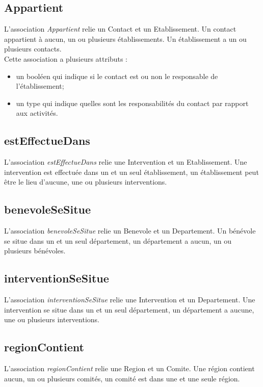 \documentclass[asi, sansVersion]{picInsa}
\begin{document}
\subsection*{Appartient}

L'association \textit{Appartient} relie un Contact et un Etablissement. Un contact appartient à aucun, un ou plusieurs établissements. Un établissement a un ou plusieurs contacts.\\
Cette association a plusieurs attributs :
\begin{itemize}
\item un booléen qui indique si le contact est ou non le responsable de l'établissement; 
\item un type qui indique quelles sont les responsabilités du contact par rapport aux activités.
\end{itemize}

\subsection*{estEffectueDans}

L'association \textit{estEffectueDans} relie une Intervention et un Etablissement. Une intervention est effectuée dans un et un seul établissement, un établissement peut être le lieu d'aucune, une ou plusieurs interventions.

\subsection*{benevoleSeSitue}

L'association \textit{benevoleSeSitue} relie un Benevole et un Departement. Un bénévole se situe dans un et un seul département, un département a aucun, un ou plusieurs bénévoles.

\subsection*{interventionSeSitue}

L'association \textit{interventionSeSitue} relie une Intervention et un Departement. Une intervention se situe dans un et un seul département, un département a aucune, une ou plusieurs interventions.

\subsection*{regionContient}

L'association \textit{regionContient} relie une Region et un Comite. Une région contient aucun, un ou plusieurs comités, un comité est dans une et une seule région.
\end{document}
